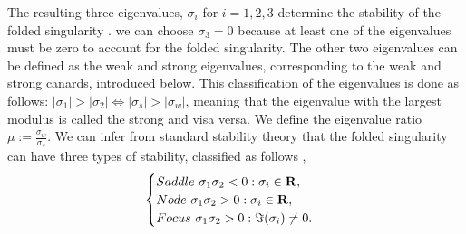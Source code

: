 The resulting three eigenvalues, $ \sigma_i $ for $ i=1,2,3 $ determine the stability of the folded singularity \citep{MMO}. \Wlg we can choose $ \sigma_3=0 $ because at least one of the eigenvalues must be zero to account for the folded singularity.
The other two eigenvalues can be defined as the weak and strong eigenvalues, corresponding to the weak and strong canards, introduced below. This classification of the eigenvalues is done as follows: $ |\sigma_1|>|\sigma_2| \iff |\sigma_s|>|\sigma_w| $, meaning that the eigenvalue with the largest modulus is called the strong and visa versa. %
We define the eigenvalue ratio $\mu:= \frac{\sigma_w}{\sigma_s}$. We can infer from standard stability theory that the folded singularity can have three types of stability, classified as follows \citep{MMO},
\begin{equation}
\begin{cases}
Saddle \ \sigma_1\sigma_2<0: \sigma_i\in\mathbf{R},\\
Node \ \sigma_1\sigma_2>0: \sigma_i\in\mathbf{R},\\
Focus \ \sigma_1\sigma_2>0: \Im(\sigma_i)\neq 0.
\end{cases}
\end{equation}


